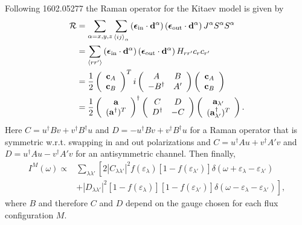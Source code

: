 \documentclass[reprint,amsmath,amssymb,aps,prb,groupedaddress,nofootinbib,superscriptaddress]{revtex4-1}
\newcommand{\1}{\mathds{1}}
\begin{document}
Following 1602.05277 the Raman operator for the Kitaev model is given by 
\begin{align}
\mathcal{R} &= \sum_{\alpha = x,y,z} \sum_{\left<ij\right>_\alpha} \left({\boldsymbol \epsilon}_{\rm in} \cdot \mathbf{d}^\alpha \right) \left({\boldsymbol \epsilon}_{\rm out} \cdot \mathbf{d}^\alpha \right) J^\alpha S^\alpha S^\alpha  \\
& = \sum_{\left<rr'\right>} \left({\boldsymbol \epsilon}_{\rm in} \cdot \mathbf{d}^\alpha \right) \left({\boldsymbol \epsilon}_{\rm out} \cdot \mathbf{d}^\alpha \right) H_{rr'} c_r c_{r'} \\ %
&= \frac{1}{2}
\left(\begin{array}{c}
\mathbf{c}_A \\
\mathbf{c}_B 
\end{array}\right)^T
i\left(\begin{array}{cc}
A & B \\ -B^\dagger & A' 
\end{array}\right) \left(\begin{array}{c}
\mathbf{c}_A \\
\mathbf{c}_B 
\end{array}\right) \\
&= \frac{1}{2}
\left(\begin{array}{c}
\mathbf{a} \\
(\mathbf{a}^\dag)^T 
\end{array}\right)^\dagger
\left(\begin{array}{cc}
C & D \\ D^\dagger & -C 
\end{array}\right) \left(\begin{array}{c}
\mathbf{a}_{\lambda'} \\
(\mathbf{a}_{\lambda'}^\dag)^T 
\end{array}\right).
\end{align}
Here \mbox{$C = u^\dag B v + v^\dag B^\dag u$} and \mbox{$D = -u^\dag B v + v^\dag B^\dag u$} for a Raman operator that is symmetric w.r.t. swapping in and out polarizations and \mbox{$C = u^\dag A u + v^\dag A' v$} and \mbox{$D = u^\dag A u - v^\dag A' v$} for an antisymmetric channel. %
Then finally,
\begin{align}
I^M(\omega) \propto& \sum_{\lambda \lambda'} \left[ 2 |C_{\lambda \lambda'}|^2 f(\varepsilon_\lambda)[1-f(\varepsilon_{\lambda'})] \delta(\omega+\varepsilon_\lambda -\varepsilon_{\lambda'}) \right. \nonumber \\
&\left. +|D_{\lambda \lambda'}|^2 [1-f(\varepsilon_{\lambda})][1-f(\varepsilon_{\lambda'})] \delta(\omega-\varepsilon_\lambda -\varepsilon_{\lambda'})
\right] ,
\end{align}
where $B$ and therefore $C$ and $D$ depend on the gauge chosen for each flux configuration $M$.
\end{document}
